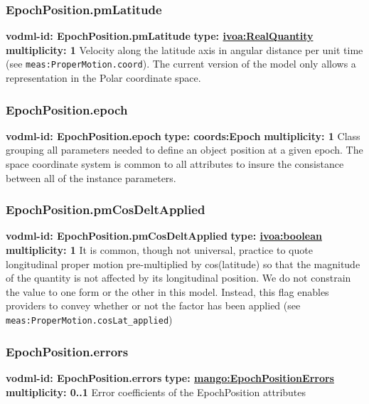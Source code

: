     \subsubsection{EpochPosition.pmLatitude}
      \textbf{vodml-id: EpochPosition.pmLatitude} \newline
      \textbf{type: \hyperref[sect:ivoa]{ivoa:RealQuantity}} \newline
      \textbf{multiplicity: 1} \newline 
      Velocity along the latitude axis in angular distance per unit time (see \texttt{meas:ProperMotion.coord}). The current version of the model only allows a representation in the Polar coordinate space.

    \subsubsection{EpochPosition.epoch}
      \textbf{vodml-id: EpochPosition.epoch} \newline
      \textbf{type: coords:Epoch} \newline
      \textbf{multiplicity: 1} \newline 
      Class grouping all parameters needed to define an object position at a given epoch. The space coordinate system is common to all attributes to insure the consistance between all of the instance parameters.

    \subsubsection{EpochPosition.pmCosDeltApplied}
      \textbf{vodml-id: EpochPosition.pmCosDeltApplied} \newline
      \textbf{type: \hyperref[sect:ivoa]{ivoa:boolean}} \newline
      \textbf{multiplicity: 1} \newline 
      It is common, though not universal, practice to quote longitudinal proper motion pre-multiplied by cos(latitude) so that the magnitude of the quantity is not affected by its longitudinal position. We do not constrain the value to one form or the other in this model. Instead, this flag enables providers to convey whether or not the factor has been applied (see \texttt{meas:ProperMotion.cosLat\_applied})

    \subsubsection{EpochPosition.errors}
      \textbf{vodml-id: EpochPosition.errors} \newline
      \textbf{type: \hyperref[sect:EpochPositionErrors]{mango:EpochPositionErrors}} \newline
      \textbf{multiplicity: 0..1} \newline 
      Error coefficients of the EpochPosition attributes


